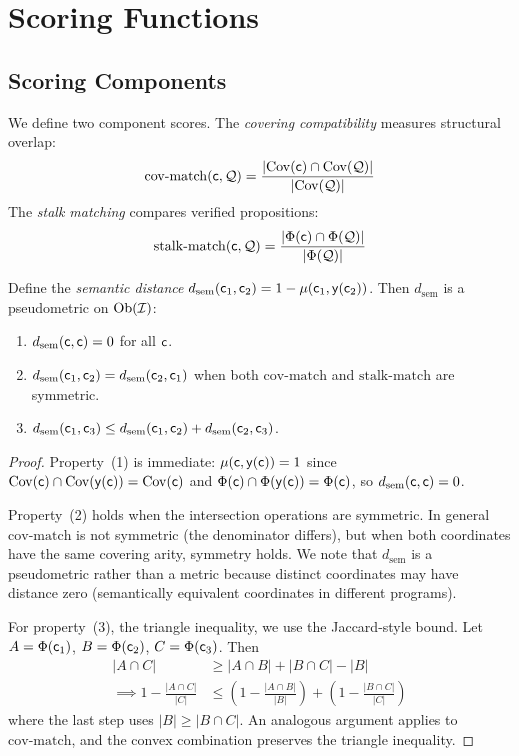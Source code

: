 \documentclass[11pt]{article}
\newcommand{\SemIndex}{\mathcal{I}}
\newcommand{\QuerySheaf}{\mathcal{Q}}
\newcommand{\MatchScore}{\mu}
\newcommand{\CoverMatch}{\mathrm{cov\text{-}match}}
\newcommand{\StalknMatch}{\mathrm{stalk\text{-}match}}
\newcommand{\SemanticDist}{d_{\mathrm{sem}}}
\newcommand{\props}{\Phi}                           %
\newcommand{\yo}{\mathsf{y}}                         %
\begin{document}
\section{Scoring Functions}\label{sec:scoring}

\subsection{Scoring Components}
We define two component scores.  The \emph{covering compatibility}
measures structural overlap:
\[
  \CoverMatch(\coord, \QuerySheaf) =
    \frac{|\Cov(\coord) \cap \Cov(\QuerySheaf)|}{|\Cov(\QuerySheaf)|}
\]
The \emph{stalk matching} compares verified propositions:
\[
  \StalknMatch(\coord, \QuerySheaf) =
    \frac{|\props(\coord) \cap \props(\QuerySheaf)|}{|\props(\QuerySheaf)|}
\]

\begin{theorem}\label{thm:scoring-metric}
Define the \emph{semantic distance}
$\SemanticDist(\coord_1, \coord_2) = 1 - \MatchScore(\coord_1,
\yo(\coord_2))$.
Then $\SemanticDist$ is a pseudometric on $\Ob(\SemIndex)$:
\begin{enumerate}[noitemsep]
  \item $\SemanticDist(\coord, \coord) = 0$ for all $\mathsf{c}$.
  \item $\SemanticDist(\coord_1, \coord_2) = \SemanticDist(\coord_2, \coord_1)$
        when both $\CoverMatch$ and $\StalknMatch$ are symmetric.
  \item $\SemanticDist(\coord_1, \coord_3) \leq
        \SemanticDist(\coord_1, \coord_2) +
        \SemanticDist(\coord_2, \coord_3)$.
\end{enumerate}
\end{theorem}

\begin{proof}
Property~(1) is immediate: $\MatchScore(\coord, \yo(\coord)) = 1$ since
$\Cov(\coord) \cap \Cov(\yo(\coord)) = \Cov(\coord)$ and
$\props(\coord) \cap \props(\yo(\coord)) = \props(\coord)$, so
$\SemanticDist(\coord, \coord) = 0$.

Property~(2) holds when the intersection operations are symmetric.
In general $\CoverMatch$ is not symmetric (the denominator differs), but
when both coordinates have the same covering arity, symmetry holds.
We note that $\SemanticDist$ is a pseudometric rather than a metric
because distinct coordinates may have distance zero (semantically
equivalent coordinates in different programs).

For property~(3), the triangle inequality, we use the Jaccard-style
bound.  Let $A = \props(\coord_1)$, $B = \props(\coord_2)$,
$C = \props(\coord_3)$.  Then
\begin{align*}
  |A \cap C| &\geq |A \cap B| + |B \cap C| - |B| \\
  \implies 1 - \frac{|A \cap C|}{|C|} &\leq
    \left(1 - \frac{|A \cap B|}{|B|}\right) +
    \left(1 - \frac{|B \cap C|}{|C|}\right)
\end{align*}
where the last step uses $|B| \geq |B \cap C|$.  An analogous argument
applies to $\CoverMatch$, and the convex combination preserves the
triangle inequality.
\end{proof}
\end{document}

